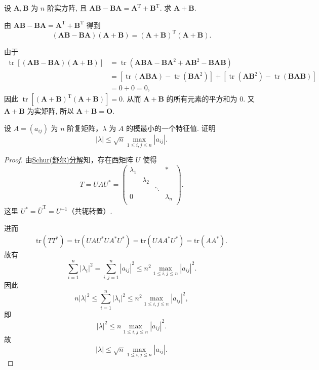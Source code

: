 \documentclass[../../main.tex]{subfiles}%
\begin{document}
\begin{example}
设 $\boldsymbol{A}, \boldsymbol{B}$ 为 $n$ 阶实方阵, 且 $\boldsymbol{AB} - \boldsymbol{BA} = \boldsymbol{A}^{\mathrm{T}} + \boldsymbol{B}^{\mathrm{T}}$. 求 $\boldsymbol{A} + \boldsymbol{B}$.
\end{example}
\begin{solution}
由 $\boldsymbol{AB} - \boldsymbol{BA} = \boldsymbol{A}^{\mathrm{T}} + \boldsymbol{B}^{\mathrm{T}}$ 得到
$$
(\boldsymbol{AB} - \boldsymbol{BA})(\boldsymbol{A} + \boldsymbol{B}) = (\boldsymbol{A} + \boldsymbol{B})^{\mathrm{T}}(\boldsymbol{A} + \boldsymbol{B}).
$$

由于
$$
\begin{aligned}
\operatorname{tr}\left[(\boldsymbol{AB} - \boldsymbol{BA})(\boldsymbol{A} + \boldsymbol{B})\right] &= \operatorname{tr}\left(\boldsymbol{ABA} - \boldsymbol{BA}^2 + \boldsymbol{AB}^2 - \boldsymbol{BAB}\right) \\
&= \left[\operatorname{tr}\left(\boldsymbol{ABA}\right) - \operatorname{tr}\left(\boldsymbol{BA}^2\right)\right] + \left[\operatorname{tr}\left(\boldsymbol{AB}^2\right) - \operatorname{tr}\left(\boldsymbol{BAB}\right)\right] \\
&= 0 + 0 = 0,
\end{aligned}
$$
因此 $\operatorname{tr}\left[(\boldsymbol{A} + \boldsymbol{B})^{\mathrm{T}}(\boldsymbol{A} + \boldsymbol{B})\right] = 0$. 从而 $\boldsymbol{A} + \boldsymbol{B}$ 的所有元素的平方和为 $0$. 又 $\boldsymbol{A} + \boldsymbol{B}$ 为实矩阵, 所以 $\boldsymbol{A} + \boldsymbol{B} = \boldsymbol{O}$.

\end{solution}

\begin{example}
设 \( A = (a_{ij}) \) 为 \( n \) 阶复矩阵，\( \lambda \) 为 \( A \) 的模最小的一个特征值. 证明
\[
|\lambda| \leqslant \sqrt{n} \max_{1 \leqslant i,j \leqslant n} |a_{ij}|.
\]
\end{example}
\begin{proof}
由\hyperref[theorem:Schur(舒尔)定理]{Schur(舒尔)分解}知，存在西矩阵 \( U \) 使得
\[
T = UAU^* = \left( \begin{matrix}
\lambda _1&		&		&		*\\
&		\lambda _2&		&		\\
&		&		\ddots&		\\
0&		&		&		\lambda _n\\
\end{matrix} \right) .
\]
这里 \( U^* = \overline{U}^\mathrm{T} =U^{-1}\)（共轭转置）.

进而
\begin{align*}
\mathrm{tr}(TT^*)= \mathrm{tr}(UAU^*UA^*U^*)= \mathrm{tr}(UAA^*U^*) = \mathrm{tr}(AA^*).
\end{align*}
故有
\[
\sum_{i=1}^n |\lambda_i|^2 = \sum_{i,j=1}^n |a_{ij}|^2 \leqslant n^2 \max_{1 \leqslant i,j \leqslant n} |a_{ij}|^2.
\]
因此
\[
n|\lambda|^2 \leqslant \sum_{i=1}^n |\lambda_i|^2 \leqslant n^2 \max_{1 \leqslant i,j \leqslant n} |a_{ij}|^2,
\]
即
\[
|\lambda|^2 \leqslant n \max_{1 \leqslant i,j \leqslant n} |a_{ij}|^2.
\]
故
\[
|\lambda| \leqslant \sqrt{n} \max_{1 \leqslant i,j \leqslant n} |a_{ij}|.
\]
\end{proof}
\end{document}
